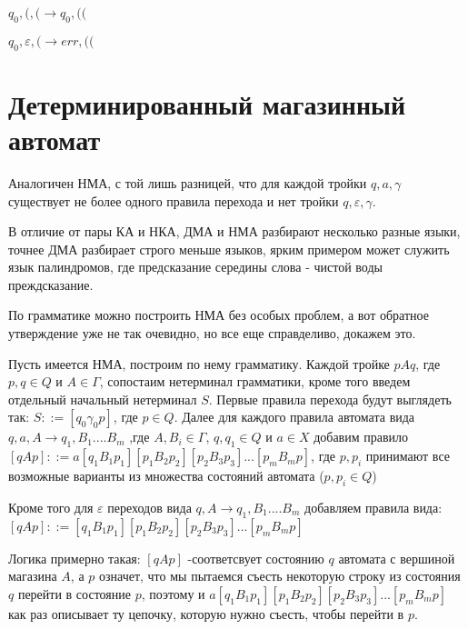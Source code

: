 $q_0, (, ( \rightarrow q_0, ( ($

$q_0, \varepsilon, ( \rightarrow err, ( ($

\section{Детерминированный магазинный автомат}

Аналогичен НМА, с той лишь разницей, что для каждой тройки $q, a, \gamma$ существует не более одного
правила перехода и нет тройки $q, \varepsilon, \gamma$.

В отличие от пары КА и НКА, ДМА и НМА разбирают несколько разные языки, точнее ДМА разбирает строго меньше языков, ярким примером может служить язык палиндромов, где предсказание середины слова -
чистой воды преждсказание.

По грамматике можно построить НМА без особых проблем, а вот обратное утверждение уже не так очевидно,
но все еще справделиво, докажем это.

Пусть имеется НМА, построим по нему грамматику. Каждой тройке $pAq$, где $p,q \in Q$ и $A \in \Gamma$,
сопостаим нетерминал грамматики, кроме того введем отдельный начальный нетерминал $S$. Первые правила
перехода будут выглядеть так: $S ::= [q_0 \gamma_0 p]$, где $p \in Q$. Далее для каждого правила
автомата вида $q, a, A \rightarrow q_1, B_1 .... B_m$ ,где $A, B_i \in \Gamma$, $q, q_1 \in Q$ и
$a \in X$ добавим правило $[qAp] ::= a[q_1 B_1 p_1][p_1 B_2 p_2][p_2 B_3 p_3]...[p_m B_m p]$, где $p, p_i$ принимают все возможные варианты из множества состояний автомата ($p,p_i \in Q$)

Кроме того для $\varepsilon$ переходов вида $q,A \rightarrow q_1, B_1 .... B_m$ добавляем правила вида: $[qAp] ::= [q_1 B_1 p_1][p_1 B_2 p_2][p_2 B_3 p_3]...[p_m B_m p]$

Логика примерно такая: $[qAp]$ -соответсвует состоянию $q$ автомата с вершиной магазина $A$, а $p$
означет, что мы пытаемся съесть некоторую строку из состояния $q$ перейти в состояние $p$, поэтому
и $a[q_1 B_1 p_1][p_1 B_2 p_2][p_2 B_3 p_3]...[p_m B_m p]$ как раз описывает ту цепочку, которую
нужно съесть, чтобы перейти в $p$.

